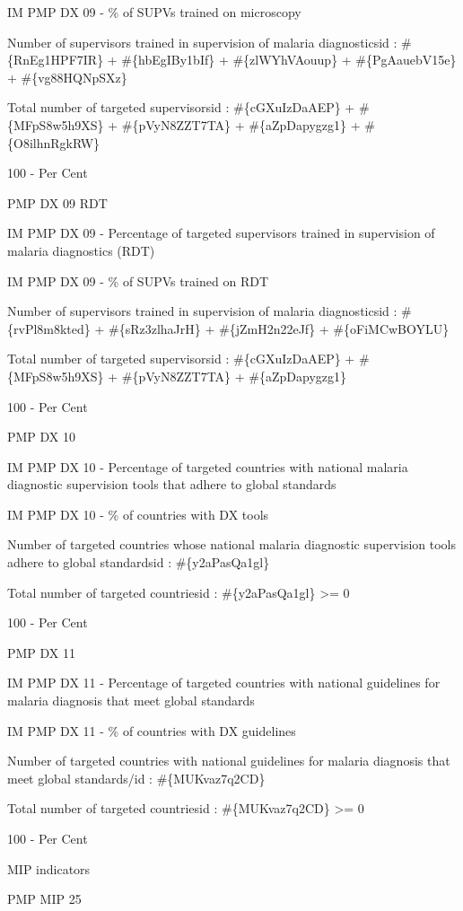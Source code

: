 \documentclass[]{book}
\begin{document}
IM PMP DX 09 - \% of SUPVs trained on microscopy

Number of supervisors trained in supervision of malaria diagnosticsid : \#\{RnEg1HPF7IR\} + \#\{hbEgIBy1bIf\} + \#\{zlWYhVAouup\} + \#\{PgAauebV15e\} + \#\{vg88HQNpSXz\}

Total number of targeted supervisorsid : \#\{cGXuIzDaAEP\} + \#\{MFpS8w5h9XS\} + \#\{pVyN8ZZT7TA\} + \#\{aZpDapygzg1\} + \#\{O8ilhnRgkRW\}

100 - Per Cent

PMP DX 09 RDT

IM PMP DX 09 - Percentage of targeted supervisors trained in supervision of malaria diagnostics (RDT)

IM PMP DX 09 - \% of SUPVs trained on RDT

Number of supervisors trained in supervision of malaria diagnosticsid : \#\{rvPl8m8kted\} + \#\{sRz3zlhaJrH\} + \#\{jZmH2n22eJf\} + \#\{oFiMCwBOYLU\}

Total number of targeted supervisorsid : \#\{cGXuIzDaAEP\} + \#\{MFpS8w5h9XS\} + \#\{pVyN8ZZT7TA\} + \#\{aZpDapygzg1\}

100 - Per Cent

PMP DX 10

IM PMP DX 10 - Percentage of targeted countries with national malaria diagnostic supervision tools that adhere to global standards

IM PMP DX 10 - \% of countries with DX tools

Number of targeted countries whose national malaria diagnostic supervision tools adhere to global standardsid : \#\{y2aPasQa1gl\}

Total number of targeted countriesid : \#\{y2aPasQa1gl\} \textgreater{}= 0

100 - Per Cent

PMP DX 11

IM PMP DX 11 - Percentage of targeted countries with national guidelines for malaria diagnosis that meet global standards

IM PMP DX 11 - \% of countries with DX guidelines

Number of targeted countries with national guidelines for malaria diagnosis that meet global standards/id : \#\{MUKvaz7q2CD\}

Total number of targeted countriesid : \#\{MUKvaz7q2CD\} \textgreater{}= 0

100 - Per Cent

MIP indicators

PMP MIP 25
\end{document}
